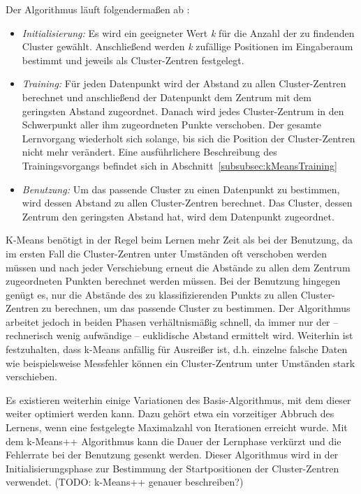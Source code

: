 Der Algorithmus läuft folgendermaßen ab \cite{Marsland}:
\begin{itemize}

\item \emph{Initialisierung:} Es wird ein geeigneter Wert \emph{k} für die Anzahl der zu findenden Cluster gewählt.
Anschließend werden \emph{k} zufällige Positionen im Eingaberaum bestimmt und jeweils als Cluster-Zentren festgelegt.
\item \emph{Training:} Für jeden Datenpunkt wird der Abstand zu allen Cluster-Zentren berechnet und anschließend der Datenpunkt dem Zentrum mit dem geringsten Abstand zugeordnet. 
Danach wird jedes Cluster-Zentrum in den Schwerpunkt aller ihm zugeordneten Punkte verschoben.
Der gesamte Lernvorgang wiederholt sich solange, bis sich die Position der Cluster-Zentren nicht mehr verändert. Eine ausführlichere Beschreibung des Trainingsvorgangs befindet sich in Abschnitt~\ref{subsubsec:kMeansTraining}
\item \emph{Benutzung:} Um das passende Cluster zu einen Datenpunkt zu bestimmen, wird dessen Abstand zu allen Cluster-Zentren berechnet. Das Cluster, dessen Zentrum den geringsten Abstand hat, wird dem Datenpunkt zugeordnet.
\end{itemize}

K-Means benötigt in der Regel beim Lernen mehr Zeit als bei der Benutzung, da im ersten Fall die Cluster-Zentren unter Umständen oft verschoben werden müssen und nach jeder Verschiebung erneut die Abstände zu allen dem Zentrum zugeordneten Punkten berechnet werden müssen. Bei der Benutzung hingegen genügt es, nur die Abstände des zu klassifizierenden Punkts zu allen Cluster-Zentren zu berechnen, um das passende Cluster zu bestimmen. Der Algorithmus arbeitet jedoch
in beiden Phasen verhältnismäßig schnell, da immer nur 
der -- rechnerisch wenig aufwändige -- euklidische Abstand ermittelt wird.
Weiterhin ist festzuhalten, dass k-Means anfällig für Ausreißer ist, d.h. einzelne falsche Daten wie beispielsweise Messfehler können ein Cluster-Zentrum unter Umständen stark verschieben.

Es existieren weiterhin einige Variationen des Basis-Algorithmus, mit dem dieser weiter optimiert werden kann. Dazu gehört etwa ein vorzeitiger Abbruch des Lernens, wenn eine festgelegte Maximalzahl von Iterationen erreicht wurde. Mit dem k-Means++ Algorithmus \cite{kMeans++} kann die Dauer der Lernphase verkürzt und die Fehlerrate bei der Benutzung gesenkt werden. Dieser Algorithmus wird in der Initialisierungsphase zur Bestimmung der Startpositionen der Cluster-Zentren verwendet. 
(TODO: k-Means++ genauer beschreiben?) %


